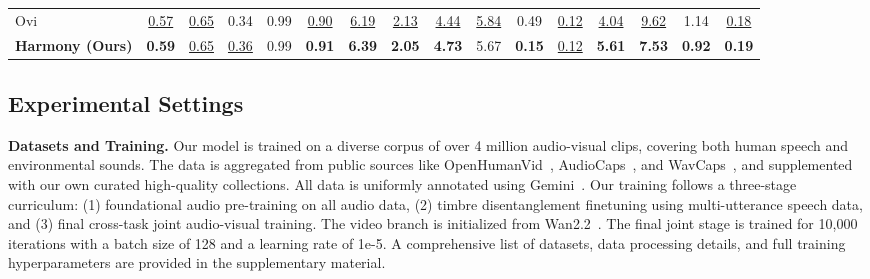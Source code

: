 \begin{table}[t]
{\begin{tabular}{l|ccccc|cccccc|cccc}
    Ovi~\cite{low2025ovi}  & \underline{0.57} & \underline{0.65} & 0.34 & 0.99 & \underline{0.90}  & \underline{6.19} & \underline{2.13} & \underline{4.44} & \underline{5.84} & 0.49 & \underline{0.12} & \underline{4.04} & \underline{9.62} & 1.14 & \underline{0.18} \\
      
    \rowcolor{CornflowerBlue!20}
    \textbf{Harmony (Ours)} & \textbf{0.59} & \underline{0.65} & \underline{0.36} & 0.99 & \textbf{0.91}  & \textbf{6.39} & \textbf{2.05} & \textbf{4.73} & 5.67 & \textbf{0.15} & \underline{0.12} & \textbf{5.61} & \textbf{7.53} & \textbf{0.92} & \textbf{0.19}\\
    
    \bottomrule
    \end{tabular}
}
\vspace{-0.1in}
\end{table}

\subsection{Experimental Settings}

\noindent\textbf{Datasets and Training.}
Our model is trained on a diverse corpus of over 4 million audio-visual clips, covering both human speech and environmental sounds. The data is aggregated from public sources like OpenHumanVid~\cite{li2025openhumanvid}, AudioCaps~\cite{kim2019audiocaps}, and WavCaps~\cite{mei2024wavcaps}, and supplemented with our own curated high-quality collections. All data is uniformly annotated using Gemini~\cite{gemini_website}. Our training follows a three-stage curriculum: (1) foundational audio pre-training on all audio data, (2) timbre disentanglement finetuning using multi-utterance speech data, and (3) final cross-task joint audio-visual training. The video branch is initialized from Wan2.2~\cite{wan}. The final joint stage is trained for 10,000 iterations with a batch size of 128 and a learning rate of 1e-5. A comprehensive list of datasets, data processing details, and full training hyperparameters are provided in the supplementary material.




